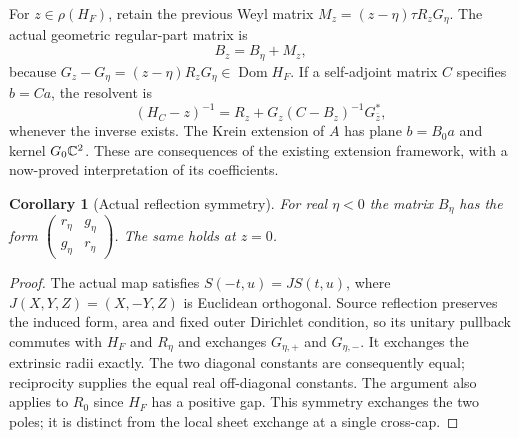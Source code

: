 \documentclass[11pt]{article}
\newtheorem{corollary}[theorem]{Corollary}
\theoremstyle{remark}\newtheorem{remark}[theorem]{Remark}
\newcommand{\Dom}{\operatorname{Dom}}\newcommand{\dd}{\,d}
\begin{document}
For $z\in\rho(H_F)$, retain the previous Weyl matrix
$M_z=(z-\eta)\tau R_zG_\eta$. The actual geometric regular-part matrix is
\begin{equation}\label{eq:regularmatrix}
 B_z=B_\eta+M_z,
\end{equation}
because $G_z-G_\eta=(z-\eta)R_zG_\eta\in\Dom H_F$.
If a self-adjoint matrix $C$ specifies $b=Ca$, the resolvent is
\[
 (H_C-z)^{-1}=R_z+G_z(C-B_z)^{-1}G_{\bar z}^*,
\]
whenever the inverse exists. The Krein extension of $A$ has plane $b=B_0a$
and kernel $G_0\mathbb C^2$. These are consequences of the existing extension
framework, with a now-proved interpretation of its coefficients.

\begin{corollary}[Actual reflection symmetry]\label{cor:reflection}
For real $\eta<0$ the matrix $B_\eta$ has the form
$\left(\begin{smallmatrix}r_\eta&g_\eta\\g_\eta&r_\eta\end{smallmatrix}\right)$.
The same holds at $z=0$.
\end{corollary}
\begin{proof}
The actual map satisfies $S(-t,u)=J S(t,u)$, where
$J(X,Y,Z)=(X,-Y,Z)$ is Euclidean orthogonal. Source reflection preserves
the induced form, area and fixed outer Dirichlet condition, so its unitary
pullback commutes with $H_F$ and $R_\eta$ and exchanges $G_{\eta,+}$ and
$G_{\eta,-}$. It exchanges the extrinsic radii exactly. The two diagonal
constants are consequently equal; reciprocity supplies the equal real
off-diagonal constants. The argument also applies to $R_0$ since $H_F$ has
a positive gap. This symmetry exchanges the two poles; it is distinct from
the local sheet exchange at a single cross-cap.
\end{proof}
\end{document}

